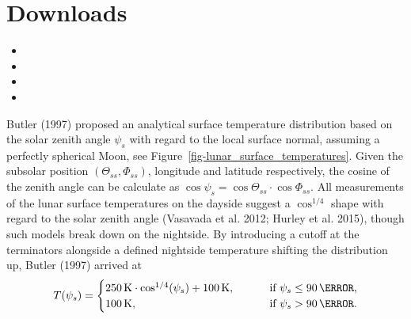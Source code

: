 \documentclass[
    fontsize=10pt,
    twoside=off,
    english,
]{scrbook}
\numberwithin{equation}{chapter}
\theoremstyle{break}
\theoremstyle{nonumberplain}
\begin{document}
\begin{Shaded}
\begin{Highlighting}[]
    \NormalTok{(}\NormalTok{(}\NormalTok{, }\SpecialCharTok{$}
    \NormalTok{(}\NormalTok{(}\NormalTok{, }\SpecialCharTok{$}
    \NormalTok{(}\NormalTok{(}\NormalTok{, }\SpecialCharTok{$}\OperatorTok{=}\NormalTok{)}

     

 \NormalTok{()}
    \NormalTok{()}
    \NormalTok{()}
    \NormalTok{()}
    \NormalTok{()}
\end{Highlighting}
\end{Shaded}

\section{Downloads}

\begin{itemize}
\tightlist
\item
\item
\item
\item
\end{itemize}

Butler (1997) proposed an analytical surface temperature distribution
based on the solar zenith angle \(\psi_s\) with regard to the local
surface normal, assuming a perfectly spherical Moon, see
Figure~\ref{fig-lunar_surface_temperatures}. Given the subsolar position
\(\left(\Theta_{ss}, \Phi_{ss}\right)\), longitude and latitude
respectively, the cosine of the zenith angle can be calculate as
\(\cos\psi_s = \cos\Theta_{ss} \cdot \cos\Phi_{ss}\). All measurements
of the lunar surface temperatures on the dayside suggest a
\(\cos^{1/4}\) shape with regard to the solar zenith angle (Vasavada et
al. 2012; Hurley et al. 2015), though such models break down on the
nightside. By introducing a cutoff at the terminators alongside a
defined nightside temperature shifting the distribution up, Butler
(1997) arrived at \begin{equation}
    T(\psi_s) = \begin{cases}
        250\,\mathrm{K} \cdot \cos^{1/4} (\psi_s) + 100\,\mathrm{K}, \qquad & \text{ if } \psi_s \leq 90\,\mathrm{\degree}, \\
        100\,\mathrm{K}, & \text{ if } \psi_s > 90\,\mathrm{\degree}.
    \end{cases} \label{eq:lunar_surface_temperatures_BUTLER}
\end{equation}
\end{document}
